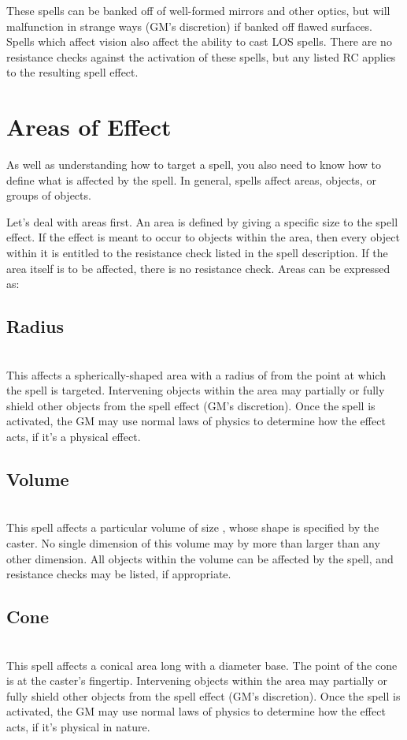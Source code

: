 \begin{multicols*}{2}
These spells can be banked off of well-formed mirrors and other optics, but will malfunction in strange ways (GM's discretion) if banked off flawed surfaces. Spells which affect vision also affect the ability to cast LOS spells.  There are no resistance checks against the activation of these spells, but any listed RC applies to the resulting spell effect.
\section{Areas of Effect}
As well as understanding how to target a spell, you also need to know how to define what is affected by the spell. In general, spells affect areas, objects, or groups of objects.

Let's deal with areas first. An area is defined by giving a specific size to the spell effect. If the effect is meant to occur to objects within the area, then every object within it is entitled to the resistance check listed in the spell description. If the area itself is to be affected, there is no resistance check. Areas can be expressed as:
\subsection{Radius}
\\
This affects a spherically-shaped area with a radius of  from the point at which the spell is targeted. Intervening objects within the area may partially or fully shield other objects from the spell effect (GM's discretion). Once the spell is activated, the GM may use normal laws of physics to determine how the effect acts, if it's a physical effect.
\subsection{Volume}
\\
This spell affects a particular volume of size , whose shape is specified by the caster. No single dimension of this volume may by more than  larger than any other dimension. All objects within the volume can be affected by the spell, and resistance checks may be listed, if appropriate.
\subsection{Cone}
\\
This spell affects a conical area  long with a  diameter base. The point of the cone is at the caster's fingertip. Intervening objects within the area may partially or fully shield other objects from the spell effect (GM's discretion). Once the spell is activated, the GM may use normal laws of physics to determine how the effect acts, if it's physical in nature.

\end{multicols*}
